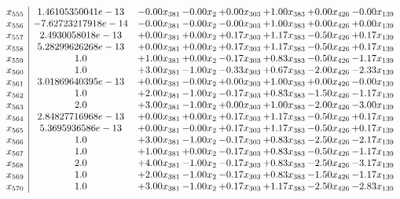 \documentclass[8pt]{article}
\begin{document}
\[\begin{array}{c| c c@{\hskip 2pt} c@{\hskip 2pt} c@{\hskip 2pt} c@{\hskip 2pt} c@{\hskip 2pt} c@{\hskip 2pt} }
 x_{555}   &  1.46105350041e-13 & -0.00 x_{381} & -0.00 x_{2} & +  0.00 x_{303} & +  1.00 x_{383} & +  0.00 x_{426} & -0.00 x_{139}\\
 x_{556}   &  -7.62723217918e-14 & -0.00 x_{381} & -0.00 x_{2} & -0.00 x_{303} & +  1.00 x_{383} & +  0.00 x_{426} & +  0.00 x_{139}\\
 x_{557}   &  2.4930058018e-13 & +  0.00 x_{381} & +  0.00 x_{2} & +  0.17 x_{303} & +  1.17 x_{383} & -0.50 x_{426} & +  0.17 x_{139}\\
 x_{558}   &  5.28299626268e-13 & +  0.00 x_{381} & +  0.00 x_{2} & +  0.17 x_{303} & +  1.17 x_{383} & -0.50 x_{426} & +  0.17 x_{139}\\
 x_{559}   &  1.0 & +  1.00 x_{381} & +  0.00 x_{2} & -0.17 x_{303} & +  0.83 x_{383} & -0.50 x_{426} & -1.17 x_{139}\\
 x_{560}   &  1.0 & +  3.00 x_{381} & -1.00 x_{2} & -0.33 x_{303} & +  0.67 x_{383} & -2.00 x_{426} & -2.33 x_{139}\\
 x_{561}   &  3.01869640395e-13 & +  0.00 x_{381} & -0.00 x_{2} & +  0.00 x_{303} & +  1.00 x_{383} & +  0.00 x_{426} & -0.00 x_{139}\\
 x_{562}   &  1.0 & +  2.00 x_{381} & -1.00 x_{2} & -0.17 x_{303} & +  0.83 x_{383} & -1.50 x_{426} & -1.17 x_{139}\\
 x_{563}   &  2.0 & +  3.00 x_{381} & -1.00 x_{2} & +  0.00 x_{303} & +  1.00 x_{383} & -2.00 x_{426} & -3.00 x_{139}\\
 x_{564}   &  2.84827716968e-13 & +  0.00 x_{381} & +  0.00 x_{2} & +  0.17 x_{303} & +  1.17 x_{383} & -0.50 x_{426} & +  0.17 x_{139}\\
 x_{565}   &  5.3695936586e-13 & +  0.00 x_{381} & -0.00 x_{2} & +  0.17 x_{303} & +  1.17 x_{383} & -0.50 x_{426} & +  0.17 x_{139}\\
 x_{566}   &  1.0 & +  3.00 x_{381} & -1.00 x_{2} & -0.17 x_{303} & +  0.83 x_{383} & -2.50 x_{426} & -2.17 x_{139}\\
 x_{567}   &  1.0 & +  1.00 x_{381} & +  0.00 x_{2} & -0.17 x_{303} & +  0.83 x_{383} & -0.50 x_{426} & -1.17 x_{139}\\
 x_{568}   &  2.0 & +  4.00 x_{381} & -1.00 x_{2} & -0.17 x_{303} & +  0.83 x_{383} & -2.50 x_{426} & -3.17 x_{139}\\
 x_{569}   &  1.0 & +  2.00 x_{381} & -1.00 x_{2} & -0.17 x_{303} & +  0.83 x_{383} & -1.50 x_{426} & -1.17 x_{139}\\
 x_{570}   &  1.0 & +  3.00 x_{381} & -1.00 x_{2} & +  0.17 x_{303} & +  1.17 x_{383} & -2.50 x_{426} & -2.83 x_{139}\\

\end{array}\]
\end{document}
